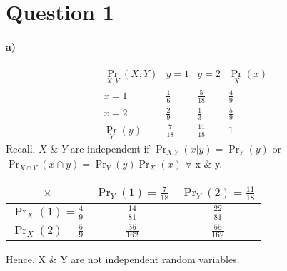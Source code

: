 \documentclass[letterpaper,12pt,titlepage,oneside,final]{book}
\begin{document}





\section*{Question 1}
\paragraph{a)}
	\[
	\begin{matrix}
	\Pr_{X,Y}(X,Y) & y=1 & y=2 & \Pr_{X}(x)\\
	x =1 & \frac{1}{6} & \frac{5}{18} & \frac{4}{9}\\
	x =2 & \frac{2}{9} & \frac{1}{3} & \frac{5}{9}\\
	\Pr_{Y}(y) & \frac{7}{18} & \frac{11}{18} & 1
	\end{matrix}
	\]
\noindent	
	Recall,  $X$ \&  $Y$ are independent if $\Pr_{X|Y}(x|y) = \Pr_{Y}(y)$ or $\Pr_{X \cap Y}(x \cap y) = \Pr_{Y}(y)\Pr_{X}(x)$ $\forall$ x \& y. 
\begin{center}
\begin{tabular}{|c |c| c|} 
\hline	
	$\times$ & $\Pr_{Y}(1) = \frac{7}{18}$ & $\Pr_{Y}(2) = \frac{11}{18}$ \\
\hline
	$\Pr_{X}(1) =  \frac{4}{9}$ & $\frac{14}{81}$ & $\frac{22}{81}$\\
\hline	
	$\Pr_{X}(2) =  \frac{5}{9}$ & $\frac{35}{162}$ & $\frac{55}{162}$\\
\hline
\end{tabular}
\end{center}
	
\noindent
Hence, X \& Y are not independent random variables.
\end{document}
